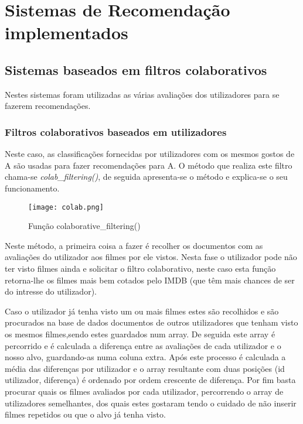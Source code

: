 \section{Sistemas de Recomendação implementados}


\subsection{Sistemas baseados em filtros colaborativos}

Nestes sistemas foram utilizadas as várias avaliações dos utilizadores para se fazerem recomendações. 

\subsubsection{Filtros colaborativos baseados em utilizadores}\hfill

Neste caso, as classificações fornecidas por utilizadores com os mesmos gostos de A são usadas para fazer recomendações para A.
O método que realiza este filtro chama-se \textit{colab\_filtering()}, de seguida apresenta-se o método e explica-se o seu funcionamento.

\begin{figure}[H]
\centering
\texttt{[image: colab.png]}
\caption {Função colaborative\_filtering()}
\label {fig01}
\end{figure}

Neste método, a primeira coisa a fazer é recolher os documentos com as avaliações do utilizador aos filmes por ele vistos. Nesta fase o utilizador pode não ter visto filmes ainda e solicitar o filtro colaborativo, neste caso esta função retorna-lhe os filmes mais bem cotados pelo IMDB (que têm mais chances de ser do intresse do utilizador).
\par Caso o utilizador já tenha visto um ou mais filmes estes são recolhidos e são procurados na base de dados documentos de outros utilizadores que tenham visto os mesmos filmes,sendo estes guardados num array. De seguida este array é percorrido e é calculada a diferença entre as avaliações de cada utilizador e o nosso alvo, guardando-as numa coluna extra.
Após este processo é calculada a média das diferenças por utilizador e o array resultante com duas posições (id utilizador, diferença) é ordenado por ordem crescente de diferença.
Por fim basta procurar quais os filmes avaliados por cada utilizador, percorrendo o array de utilizadores semelhantes, dos quais estes gostaram tendo o cuidado de não inserir filmes repetidos ou que o alvo já tenha visto.

